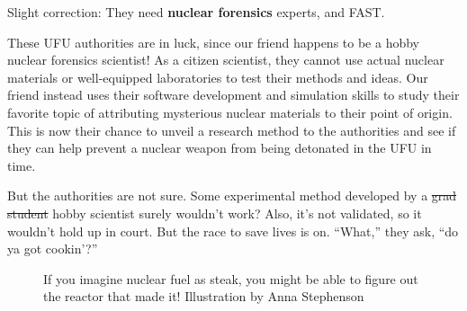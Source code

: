 {\begin{shadequote}

  Slight correction: They need \textbf{nuclear forensics} experts, and FAST. 
  
  These UFU authorities are in luck, since our friend happens to be a hobby
  nuclear forensics scientist! As a citizen scientist, they cannot use actual
  nuclear materials or well-equipped laboratories to test their methods and
  ideas. Our friend instead uses their software development and simulation
  skills to study their favorite topic of attributing mysterious nuclear
  materials to their point of origin. This is now their chance to unveil a
  research method to the authorities and see if they can help prevent a nuclear
  weapon from being detonated in the UFU in time. 
  
  But the authorities are not sure. Some experimental method developed by a
  \sout{grad student} hobby scientist surely wouldn't work? Also, it's not
  validated, so it wouldn't hold up in court. But the race to save lives is on.
  ``What,'' they ask, ``do ya got cookin'?''

\end{shadequote}

\begin{figure}[!htb]
  \centering
  \large If you imagine nuclear fuel as steak, you might be able to figure out 
  the reactor that made it! \small Illustration by Anna Stephenson
\end{figure}

}
